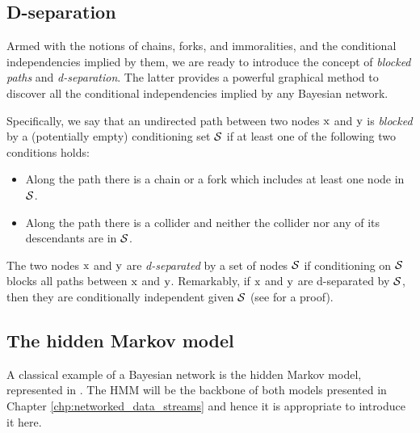 \subsection{D-separation}
\label{sec:d_separation}
Armed with the notions of chains, forks, and immoralities, and the conditional independencies implied by them, we are ready to introduce the concept of \emph{blocked paths} and \emph{d-separation}. The latter provides a powerful graphical method to discover all the conditional independencies implied by any Bayesian network.

Specifically, we say that an undirected path between two nodes ${\textnormal{x}}$ and ${\textnormal{y}}$ is \emph{blocked} by a (potentially empty) conditioning set ${\mathcal{S}}$ if at least one of the following two conditions holds:
\begin{itemize}
    \item Along the path there is a chain or a fork which includes at least one node in ${\mathcal{S}}$.
    \item Along the path there is a collider and neither the collider nor any of its descendants are in ${\mathcal{S}}$.
\end{itemize}
The two nodes ${\textnormal{x}}$ and ${\textnormal{y}}$ are \emph{d-separated} by a set of nodes ${\mathcal{S}}$ if conditioning on ${\mathcal{S}}$ blocks all paths between ${\textnormal{x}}$ and ${\textnormal{y}}$. Remarkably, if ${\textnormal{x}}$ and ${\textnormal{y}}$ are d-separated by ${\mathcal{S}}$, then they are conditionally independent given ${\mathcal{S}}$ (see \citet{Koller2009} for a proof).

\subsection{The hidden Markov model}
\label{sec:hmm}
A classical example of a Bayesian network is the hidden Markov model, represented in . The HMM will be the backbone of both models presented in Chapter \ref{chp:networked_data_streams} and hence it is appropriate to introduce it here.

